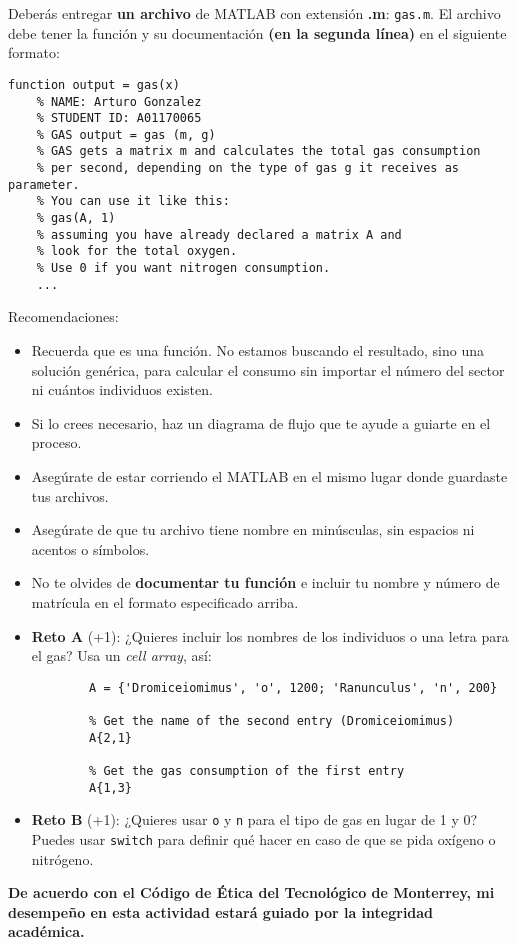 \documentclass[]{book}
\newcommand{\matlab}[1]{\lstinline[style=Matlab-pyglike]!#1!}
\theoremstyle{definition}
\begin{document}
\bigskip

Deberás entregar \textbf{un archivo} de MATLAB con extensión \textbf{.m}: \texttt{gas.m}.
El archivo debe tener la función y su documentación \textbf{(en la segunda línea)} en el siguiente formato:

\bigskip

\begin{lstlisting}[style=Matlab-editor]
    function output = gas(x)
    % NAME: Arturo Gonzalez
    % STUDENT ID: A01170065
    % GAS output = gas (m, g)
    % GAS gets a matrix m and calculates the total gas consumption
    % per second, depending on the type of gas g it receives as parameter.
    % You can use it like this:
    % gas(A, 1)
    % assuming you have already declared a matrix A and
    % look for the total oxygen.
    % Use 0 if you want nitrogen consumption.
    ...
\end{lstlisting}

\pagebreak

{\Large Recomendaciones:}

\begin{itemize}
    \item Recuerda que es una función. No estamos buscando el resultado, sino una solución genérica, para calcular el consumo sin importar el número del sector ni cuántos individuos existen.
    \item Si lo crees necesario, haz un diagrama de flujo que te ayude a guiarte en el proceso.
    \item Asegúrate de estar corriendo el MATLAB en el mismo lugar donde guardaste tus archivos.
    \item Asegúrate de que tu archivo tiene nombre en minúsculas, sin espacios ni acentos o símbolos. 
    \item No te olvides de \textbf{documentar tu función} e incluir tu nombre y número de matrícula en el formato especificado arriba.
    \item \textbf{Reto A} (+1): ¿Quieres incluir los nombres de los individuos o una letra para el gas? Usa un \textit{cell array}, así:
    \begin{lstlisting}[style=Matlab-editor]
        % declare the array
        A = {'Dromiceiomimus', 'o', 1200; 'Ranunculus', 'n', 200}
        
        % Get the name of the second entry (Dromiceiomimus)
        A{2,1}

        % Get the gas consumption of the first entry
        A{1,3}
    \end{lstlisting}
    \item \textbf{Reto B} (+1): ¿Quieres usar \texttt{o} y \texttt{n} para el tipo de gas en lugar de 1 y 0? Puedes usar \matlab{switch} para definir qué hacer en caso de que se pida oxígeno o nitrógeno.
\end{itemize}

\vfill

\textbf{De acuerdo con el Código de Ética del Tecnológico de Monterrey, mi desempeño en esta actividad estará guiado por la integridad académica.}
\end{document}
